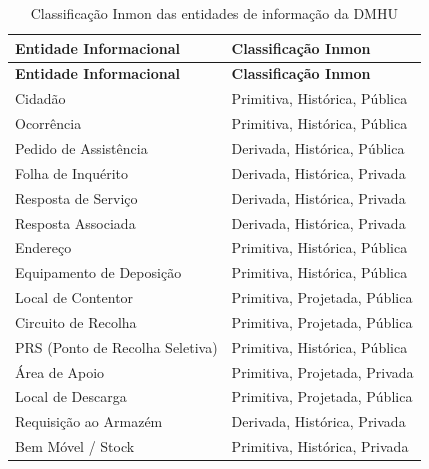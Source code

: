 \documentclass[12pt,a4paper,final]{article}
\begin{document}
    \renewcommand{\arraystretch}{1.3}
    \begin{longtable}{|p{6cm}|p{7cm}|}
        \caption{Classificação Inmon das entidades de informação da DMHU}
        \label{tab:inmon} \\
        \hline
        \textbf{Entidade Informacional}          & \textbf{Classificação Inmon}    \\
        \hline
        \endfirsthead

        \hline
        \textbf{Entidade Informacional}          & \textbf{Classificação Inmon}    \\
        \hline
        \endhead

        \hline
        \endfoot

        Cidadão                                  & Primitiva, Histórica, Pública   \\
        Ocorrência                               & Primitiva, Histórica, Pública   \\
        Pedido de Assistência                    & Derivada, Histórica, Pública    \\
        Folha de Inquérito                       & Derivada, Histórica, Privada    \\
        Resposta de Serviço                      & Derivada, Histórica, Privada    \\
        Resposta Associada                       & Derivada, Histórica, Privada    \\
        Endereço                                 & Primitiva, Histórica, Pública   \\
        Equipamento de Deposição                 & Primitiva, Histórica, Pública   \\
        Local de Contentor                       & Primitiva, Projetada, Pública   \\
        Circuito de Recolha                      & Primitiva, Projetada, Pública   \\
        PRS (Ponto de Recolha Seletiva)          & Primitiva, Histórica, Pública   \\
        Área de Apoio                            & Primitiva, Projetada, Privada   \\
        Local de Descarga                        & Primitiva, Projetada, Pública   \\
        Requisição ao Armazém                    & Derivada, Histórica, Privada    \\
        Bem Móvel / Stock                        & Primitiva, Histórica, Privada   \\

\end{longtable}
\end{document}
